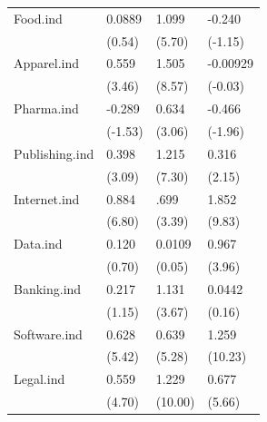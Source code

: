 \begin{longtable}{p{3 cm} p{2.25 cm} p{2.25 cm} p{2.25 cm}}
Food.ind &      0.0889         &       1.099\sym{***}&      -0.240         \\
            &      (0.54)         &      (5.70)         &     (-1.15)         \\
Apparel.ind &       0.559\sym{***}&       1.505\sym{***}&    -0.00929         \\
            &      (3.46)         &      (8.57)         &     (-0.03)         \\
Pharma.ind &      -0.289         &       0.634\sym{**} &      -0.466\sym{*}  \\
            &     (-1.53)         &      (3.06)         &     (-1.96)         \\
Publishing.ind &       0.398\sym{**} &       1.215\sym{***}&       0.316\sym{*}  \\
            &      (3.09)         &      (7.30)         &      (2.15)         \\
Internet.ind &       0.884\sym{***}&       .699\sym{***}&       1.852\sym{***}\\
            &      (6.80)         &      (3.39)         &      (9.83)         \\
Data.ind &       0.120         &   0.0109     &       0.967\sym{***}       \\
            &      (0.70)         &      (0.05)         &        (3.96)       \\
Banking.ind &       0.217         &       1.131\sym{***}&      0.0442         \\
            &      (1.15)         &      (3.67)         &      (0.16)         \\
Software.ind &       0.628\sym{***}&      0.639\sym{***} &       1.259\sym{***}\\
            &      (5.42)         &     (5.28)         &             (10.23)  \\
Legal.ind &       0.559\sym{***}&       1.229\sym{***}&       0.677\sym{***}\\
            &      (4.70)         &     (10.00)         &      (5.66)         \\


\end{longtable}
